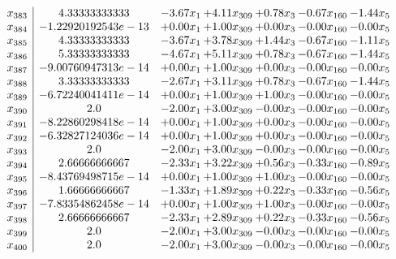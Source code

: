 \documentclass[8pt]{article}
\begin{document}
\[\begin{array}{c| c c@{\hskip 2pt} c@{\hskip 2pt} c@{\hskip 2pt} c@{\hskip 2pt} c@{\hskip 2pt} }
 x_{383}   &  4.33333333333 & -3.67 x_{1} & +  4.11 x_{309} & +  0.78 x_{3} & -0.67 x_{160} & -1.44 x_{5}\\
 x_{384}   &  -1.22920192543e-13 & +  0.00 x_{1} & +  1.00 x_{309} & +  0.00 x_{3} & -0.00 x_{160} & -0.00 x_{5}\\
 x_{385}   &  4.33333333333 & -3.67 x_{1} & +  3.78 x_{309} & +  1.44 x_{3} & -0.67 x_{160} & -1.11 x_{5}\\
 x_{386}   &  5.33333333333 & -4.67 x_{1} & +  5.11 x_{309} & +  0.78 x_{3} & -0.67 x_{160} & -1.44 x_{5}\\
 x_{387}   &  -9.00760947313e-14 & +  0.00 x_{1} & +  1.00 x_{309} & +  0.00 x_{3} & -0.00 x_{160} & -0.00 x_{5}\\
 x_{388}   &  3.33333333333 & -2.67 x_{1} & +  3.11 x_{309} & +  0.78 x_{3} & -0.67 x_{160} & -1.44 x_{5}\\
 x_{389}   &  -6.72240041411e-14 & +  0.00 x_{1} & +  1.00 x_{309} & +  1.00 x_{3} & -0.00 x_{160} & -0.00 x_{5}\\
 x_{390}   &  2.0 & -2.00 x_{1} & +  3.00 x_{309} & -0.00 x_{3} & -0.00 x_{160} & -0.00 x_{5}\\
 x_{391}   &  -8.22860298418e-14 & +  0.00 x_{1} & +  1.00 x_{309} & +  0.00 x_{3} & -0.00 x_{160} & -0.00 x_{5}\\
 x_{392}   &  -6.32827124036e-14 & +  0.00 x_{1} & +  1.00 x_{309} & +  0.00 x_{3} & -0.00 x_{160} & -0.00 x_{5}\\
 x_{393}   &  2.0 & -2.00 x_{1} & +  3.00 x_{309} & -0.00 x_{3} & -0.00 x_{160} & -0.00 x_{5}\\
 x_{394}   &  2.66666666667 & -2.33 x_{1} & +  3.22 x_{309} & +  0.56 x_{3} & -0.33 x_{160} & -0.89 x_{5}\\
 x_{395}   &  -8.43769498715e-14 & +  0.00 x_{1} & +  1.00 x_{309} & +  1.00 x_{3} & -0.00 x_{160} & -0.00 x_{5}\\
 x_{396}   &  1.66666666667 & -1.33 x_{1} & +  1.89 x_{309} & +  0.22 x_{3} & -0.33 x_{160} & -0.56 x_{5}\\
 x_{397}   &  -7.83354862458e-14 & +  0.00 x_{1} & +  1.00 x_{309} & +  1.00 x_{3} & -0.00 x_{160} & -0.00 x_{5}\\
 x_{398}   &  2.66666666667 & -2.33 x_{1} & +  2.89 x_{309} & +  0.22 x_{3} & -0.33 x_{160} & -0.56 x_{5}\\
 x_{399}   &  2.0 & -2.00 x_{1} & +  3.00 x_{309} & -0.00 x_{3} & -0.00 x_{160} & -0.00 x_{5}\\
 x_{400}   &  2.0 & -2.00 x_{1} & +  3.00 x_{309} & -0.00 x_{3} & -0.00 x_{160} & -0.00 x_{5}\\

\end{array}\]
\end{document}
